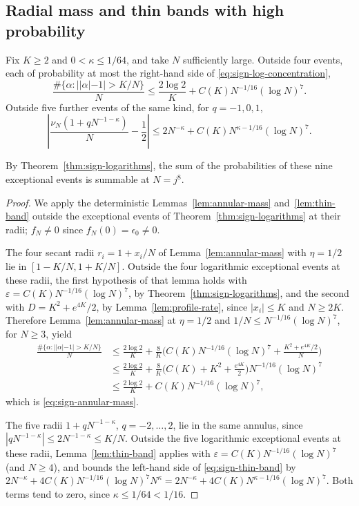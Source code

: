 \subsection{Radial mass and thin bands with high probability}

\begin{corollary}\label{cor:radial-probability}
Fix $K\ge2$ and $0<\kappa\le1/64$, and take $N$ sufficiently large.
Outside four events, each of probability at most the right-hand side of
\eqref{eq:sign-log-concentration},
\begin{equation}
 \frac{\#\{\alpha:||\alpha|-1|>K/N\}}N
 \le\frac{2\log2}{K}+C(K)N^{-1/16}(\log N)^7.
                                                        \label{eq:sign-annular-mass}
\end{equation}
Outside five further events of the same kind, for
$q=-1,0,1$,
\begin{equation}
 \left|\frac{\nu_N(1+qN^{-1-\kappa})}N-\frac12\right|
 \le2N^{-\kappa}+C(K)N^{\kappa-1/16}(\log N)^7.
                                                        \label{eq:sign-thin-band}
\end{equation}
\end{corollary}

By Theorem~\ref{thm:sign-logarithms}, the sum of the probabilities of
these nine exceptional events is summable at $N=j^8$.

\begin{proof}
We apply the deterministic Lemmas~\ref{lem:annular-mass}
and~\ref{lem:thin-band} outside the exceptional events of
Theorem~\ref{thm:sign-logarithms} at their radii; $f_N\ne0$ since
$f_N(0)=\epsilon_0\ne0$.

The four secant radii $r_i=1+x_i/N$ of Lemma~\ref{lem:annular-mass} with
$\eta=1/2$ lie in $[1-K/N,1+K/N]$. Outside the four logarithmic
exceptional events at these radii, the first hypothesis of that lemma
holds with $\varepsilon=C(K)N^{-1/16}(\log N)^7$, by
Theorem~\ref{thm:sign-logarithms}, and the second with
$D=K^2+e^{4K}/2$, by Lemma~\ref{lem:profile-rate}, since $|x_i|\le K$
and $N\ge2K$.
Therefore Lemma~\ref{lem:annular-mass} at $\eta=1/2$ and
$1/N\le N^{-1/16}(\log N)^7$, for $N\ge3$, yield
\begin{align*}
 \frac{\#\{\alpha:||\alpha|-1|>K/N\}}N
 &\le\frac{2\log2}K+\frac8K\Big(C(K)N^{-1/16}(\log N)^7
       +\frac{K^2+e^{4K}/2}N\Big)\\
 &\le\frac{2\log2}K+\frac8K\Big(C(K)+K^2+\frac{e^{4K}}2\Big)
       N^{-1/16}(\log N)^7\\
 &\le\frac{2\log2}{K}+C(K)N^{-1/16}(\log N)^7,
\end{align*}
which is \eqref{eq:sign-annular-mass}.

The five radii $1+qN^{-1-\kappa}$, $q=-2,\dots,2$, lie in the same
annulus, since $|qN^{-1-\kappa}|\le2N^{-1-\kappa}\le K/N$.
Outside the five logarithmic exceptional events at these radii,
Lemma~\ref{lem:thin-band} applies with
$\varepsilon=C(K)N^{-1/16}(\log N)^7$ (and $N\ge4$), and bounds the
left-hand side of \eqref{eq:sign-thin-band} by
$2N^{-\kappa}+4C(K)N^{-1/16}(\log N)^7N^{\kappa}
=2N^{-\kappa}+4C(K)N^{\kappa-1/16}(\log N)^7$.
Both terms tend to zero, since $\kappa\le1/64<1/16$.
\end{proof}

